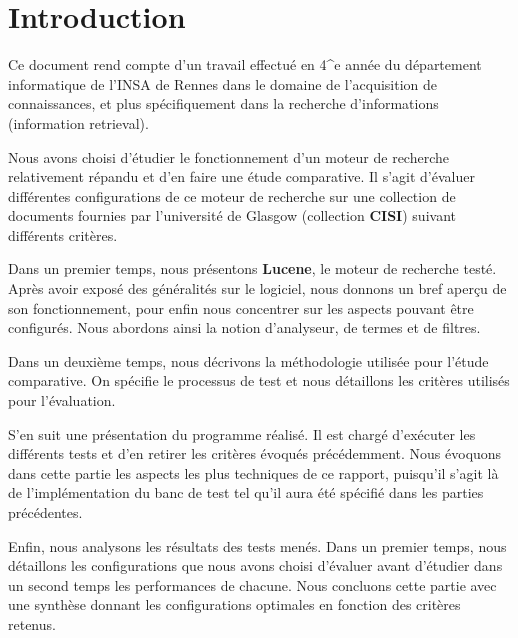 \section{Introduction}

Ce document rend compte d’un travail effectué en 4^{e} année du département informatique de l’INSA de Rennes dans le domaine de l’acquisition de connaissances, et plus spécifiquement dans la recherche d’informations (information retrieval).

Nous avons choisi d’étudier le fonctionnement d’un moteur de recherche relativement répandu et d’en faire une étude comparative. Il s’agit d’évaluer différentes configurations de ce moteur de recherche sur une collection de documents fournies par l’université de Glasgow (collection \textbf{CISI}) suivant différents critères.

Dans un premier temps, nous présentons \textbf{Lucene}, le moteur de recherche testé. Après avoir exposé des généralités sur le logiciel, nous donnons un bref aperçu de son fonctionnement, pour enfin nous concentrer sur les aspects pouvant être configurés. Nous abordons ainsi la notion d’analyseur, de termes et de filtres.

Dans un deuxième temps, nous décrivons la méthodologie utilisée pour l’étude comparative. On spécifie le processus de test et nous détaillons les critères utilisés pour l’évaluation.

S’en suit une présentation du programme réalisé. Il est chargé d’exécuter les différents tests et d’en retirer les critères évoqués précédemment. Nous évoquons dans cette partie les aspects les plus techniques de ce rapport, puisqu’il s’agit là de l’implémentation du banc de test tel qu’il aura été spécifié dans les parties précédentes.

Enfin, nous analysons les résultats des tests menés. Dans un premier temps, nous détaillons les configurations que nous avons choisi d’évaluer avant d’étudier dans un second temps les performances de chacune. Nous concluons cette partie avec une synthèse donnant les configurations optimales en fonction des critères retenus.

























